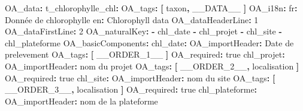 \documentclass[
  letterpaper,
  DIV=11,
  numbers=noendperiod]{scrartcl}
\newenvironment{Shaded}{\begin{snugshade}}{\end{snugshade}}
\newcommand{\AttributeTok}[1]{\textcolor[rgb]{0.40,0.45,0.13}{#1}}
\newcommand{\CharTok}[1]{\textcolor[rgb]{0.13,0.47,0.30}{#1}}
\newcommand{\DecValTok}[1]{\textcolor[rgb]{0.68,0.00,0.00}{#1}}
\newcommand{\FunctionTok}[1]{\textcolor[rgb]{0.28,0.35,0.67}{#1}}
\newcommand{\KeywordTok}[1]{\textcolor[rgb]{0.00,0.23,0.31}{\textbf{#1}}}
\begin{document}
\begin{Shaded}
\begin{Highlighting}[]
\FunctionTok{OA\_data}\KeywordTok{:}
\AttributeTok{  }\FunctionTok{t\_chlorophylle\_chl}\KeywordTok{:}
\AttributeTok{  }\FunctionTok{OA\_tags}\KeywordTok{:}\AttributeTok{ }\KeywordTok{[}\AttributeTok{ taxon}\KeywordTok{,}\AttributeTok{ \_\_DATA\_\_ }\KeywordTok{]}
\AttributeTok{  }\FunctionTok{OA\_i18n}\KeywordTok{:}
\AttributeTok{    }\FunctionTok{fr}\KeywordTok{:}\AttributeTok{ Donnée de chlorophylle}
\AttributeTok{    }\FunctionTok{en}\KeywordTok{:}\AttributeTok{ Chlorophyll data}
\AttributeTok{  }\FunctionTok{OA\_dataHeaderLine}\KeywordTok{:}\AttributeTok{ }\DecValTok{1}
\AttributeTok{  }\FunctionTok{OA\_dataFirstLine}\KeywordTok{:}\AttributeTok{ }\DecValTok{2}
\AttributeTok{  }\FunctionTok{OA\_naturalKey}\KeywordTok{:}
\AttributeTok{    }\KeywordTok{{-}}\AttributeTok{ chl\_date}
\AttributeTok{    }\KeywordTok{{-}}\AttributeTok{ chl\_projet}
\AttributeTok{    }\KeywordTok{{-}}\AttributeTok{ chl\_site}
\AttributeTok{    }\KeywordTok{{-}}\AttributeTok{ chl\_plateforme}
\AttributeTok{  }\FunctionTok{OA\_basicComponents}\KeywordTok{:}
\AttributeTok{    }\FunctionTok{chl\_date}\KeywordTok{:}
\AttributeTok{      }\FunctionTok{OA\_importHeader}\KeywordTok{:}\AttributeTok{ Date de prelevement}
\AttributeTok{      }\FunctionTok{OA\_tags}\KeywordTok{:}\AttributeTok{ }\KeywordTok{[}\AttributeTok{ \_\_ORDER\_}\DecValTok{1\_\_}\AttributeTok{ }\KeywordTok{]}
\AttributeTok{      }\FunctionTok{OA\_required}\KeywordTok{:}\AttributeTok{ }\CharTok{true}
\AttributeTok{    }\FunctionTok{chl\_projet}\KeywordTok{:}
\AttributeTok{      }\FunctionTok{OA\_importHeader}\KeywordTok{:}\AttributeTok{ nom du projet}
\AttributeTok{      }\FunctionTok{OA\_tags}\KeywordTok{:}\AttributeTok{ }\KeywordTok{[}\AttributeTok{ \_\_ORDER\_}\DecValTok{2\_\_}\KeywordTok{,}\AttributeTok{ localisation }\KeywordTok{]}
\AttributeTok{      }\FunctionTok{OA\_required}\KeywordTok{:}\AttributeTok{ }\CharTok{true}
\AttributeTok{    }\FunctionTok{chl\_site}\KeywordTok{:}
\AttributeTok{      }\FunctionTok{OA\_importHeader}\KeywordTok{:}\AttributeTok{ nom du site}
\AttributeTok{      }\FunctionTok{OA\_tags}\KeywordTok{:}\AttributeTok{ }\KeywordTok{[}\AttributeTok{ \_\_ORDER\_}\DecValTok{3\_\_}\KeywordTok{,}\AttributeTok{ localisation }\KeywordTok{]}
\AttributeTok{      }\FunctionTok{OA\_required}\KeywordTok{:}\AttributeTok{ }\CharTok{true}
\AttributeTok{    }\FunctionTok{chl\_plateforme}\KeywordTok{:}
\AttributeTok{      }\FunctionTok{OA\_importHeader}\KeywordTok{:}\AttributeTok{ nom de la plateforme}

\end{Highlighting}
\end{Shaded}
\end{document}
